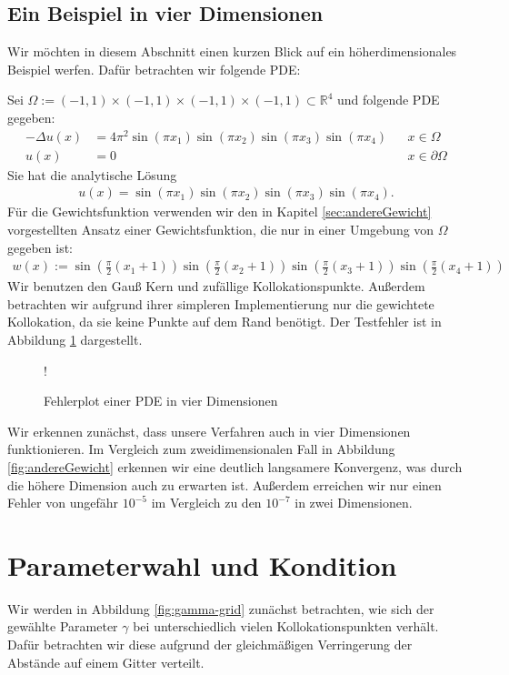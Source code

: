 \subsection{Ein Beispiel in vier Dimensionen}
\label{sec:4D}
Wir möchten in diesem Abschnitt einen kurzen Blick auf ein höherdimensionales Beispiel werfen. Dafür betrachten wir folgende \ac{PDE}:

Sei $\Omega := (-1,1) \times (-1,1) \times (-1,1) \times (-1,1) \subset \mathbb{R}^4$ und folgende \ac{PDE} gegeben:
\begin{align*}
- \Delta u(x) &= 4\pi^2 \sin(\pi x_1)\sin(\pi x_2)\sin(\pi x_3)\sin(\pi x_4)&& x \in \Omega\\
u(x) &= 0&& x \in \partial \Omega
\end{align*}
Sie hat die analytische Lösung 
\begin{align*}
u(x) = \sin(\pi x_1)\sin(\pi x_2)\sin(\pi x_3)\sin(\pi x_4).
\end{align*}
Für die Gewichtsfunktion verwenden wir den in Kapitel \ref{sec:andereGewicht} vorgestellten Ansatz einer Gewichtsfunktion, die nur in einer Umgebung von $\Omega$ gegeben ist:
\begin{align*}
	w(x) := \sin\left(\frac{\pi}{2}(x_1+1)\right)\sin\left(\frac{\pi}{2}(x_2+1)\right) \sin\left(\frac{\pi}{2}(x_3+1)\right)\sin\left(\frac{\pi}{2}(x_4+1)\right)
\end{align*}
Wir benutzen den Gauß Kern und zufällige Kollokationspunkte. Außerdem betrachten wir aufgrund ihrer simpleren Implementierung nur die gewichtete Kollokation, da sie keine Punkte auf dem Rand benötigt. Der Testfehler ist in Abbildung \ref{fig:4dim} dargestellt.
\begin{figure}[ht]
	\centering
	\resizebox {\columnwidth} {!} {
		
	}
	\caption{Fehlerplot einer \acs{PDE} in vier Dimensionen}
	\label{fig:4dim}
\end{figure}

Wir erkennen zunächst, dass unsere Verfahren auch in vier Dimensionen funktionieren. Im Vergleich zum zweidimensionalen Fall in Abbildung \ref{fig:andereGewicht} erkennen wir eine deutlich langsamere Konvergenz, was durch die höhere Dimension auch zu erwarten ist. Außerdem erreichen wir nur einen Fehler von ungefähr $10^{-5}$ im Vergleich zu den $10^{-7}$ in zwei Dimensionen.
\section{Parameterwahl und Kondition}
Wir werden in Abbildung \ref{fig:gamma-grid} zunächst betrachten, wie sich der gewählte Parameter $\gamma$ bei unterschiedlich vielen Kollokationspunkten verhält. Dafür betrachten wir diese aufgrund der gleichmäßigen Verringerung der Abstände auf einem Gitter verteilt. 

